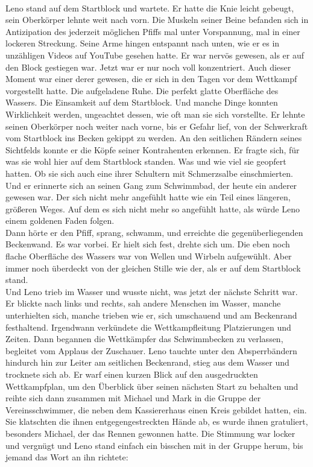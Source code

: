 \documentclass[ngerman,smalldemyvopaper,11pt,oneside,onecolumn,openright,extrafontsizes]{memoir}
\begin{document}
\vspace{0.5em} \\
Leno stand auf dem Startblock und wartete. Er hatte die Knie leicht gebeugt, sein Oberkörper lehnte weit nach vorn. Die Muskeln seiner Beine befanden sich in Antizipation des jederzeit möglichen Pfiffs mal unter Vorspannung, mal in einer lockeren Streckung. Seine Arme hingen entspannt nach unten, wie er es in unzähligen Videos auf YouTube gesehen hatte. Er war nervös gewesen, als er auf den Block gestiegen war. Jetzt war er nur noch voll konzentriert. Auch dieser Moment war einer derer gewesen, die er sich in den Tagen vor dem Wettkampf vorgestellt hatte. Die aufgeladene Ruhe. Die perfekt glatte Oberfläche des Wassers. Die Einsamkeit auf dem Startblock. Und manche Dinge konnten Wirklichkeit werden, ungeachtet dessen, wie oft man sie sich vorstellte. Er lehnte seinen Oberkörper noch weiter nach vorne, bis er Gefahr lief, von der Schwerkraft vom Startblock ins Becken gekippt zu werden. An den seitlichen Rändern seines Sichtfelds konnte er die Köpfe seiner Kontrahenten erkennen. Er fragte sich, für was sie wohl hier auf dem Startblock standen. Was und wie viel sie geopfert hatten. Ob sie sich auch eine ihrer Schultern mit Schmerzsalbe einschmierten. Und er erinnerte sich an seinen Gang zum Schwimmbad, der heute ein anderer gewesen war. Der sich nicht mehr angefühlt hatte wie ein Teil eines längeren, größeren Weges. Auf dem es sich nicht mehr so angefühlt hatte, als würde Leno einem goldenen Faden folgen.\\
Dann hörte er den Pfiff, sprang, schwamm, und erreichte die gegenüberliegenden Beckenwand. Es war vorbei. Er hielt sich fest, drehte sich um. Die eben noch flache Oberfläche des Wassers war von Wellen und Wirbeln aufgewühlt. Aber immer noch überdeckt von der gleichen Stille wie der, als er auf dem Startblock stand.\\
Und Leno trieb im Wasser und wusste nicht, was jetzt der nächste Schritt war. Er blickte nach links und rechts, sah andere Menschen im Wasser, manche unterhielten sich, manche trieben wie er, sich umschauend und am Beckenrand festhaltend. Irgendwann verkündete die Wettkampfleitung Platzierungen und Zeiten. Dann begannen die Wettkämpfer das Schwimmbecken zu verlassen, begleitet vom Applaus der Zuschauer. Leno tauchte unter den Absperrbändern hindurch hin zur Leiter am seitlichen Beckenrand, stieg aus dem Wasser und trocknete sich ab. Er warf einen kurzen Blick auf den ausgedruckten Wettkampfplan, um den Überblick über seinen nächsten Start zu behalten und reihte sich dann zusammen mit Michael und Mark in die Gruppe der Vereinsschwimmer, die neben dem Kassiererhaus einen Kreis gebildet hatten, ein. Sie klatschten die ihnen entgegengestreckten Hände ab, es wurde ihnen gratuliert, besonders Michael, der das Rennen gewonnen hatte. Die Stimmung war locker und vergnügt und Leno stand einfach ein bisschen mit in der Gruppe herum, bis jemand das Wort an ihn richtete:\\
\end{document}
